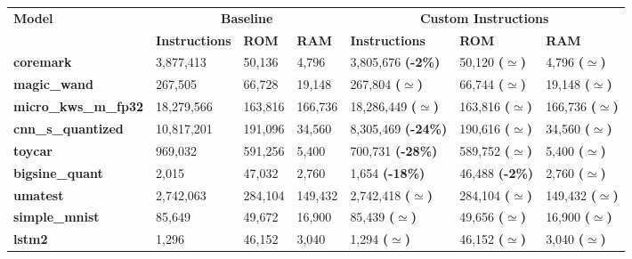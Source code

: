 \begin{table}[!ht]
    \scriptsize
    \centering
    \begin{tabular}{|l|l|l|l|l|l|l|}
        \hline
        {\textbf{Model}} & \multicolumn{3}{c|}{\textbf{Baseline}} & \multicolumn{3}{c|}{\textbf{Custom Instructions}} \\
        \cline{2-7}
        & \textbf{Instructions} & \textbf{ROM} & \textbf{RAM} & \textbf{Instructions} & \textbf{ROM} & \textbf{RAM} \\
        \hline
        {\textbf{coremark}} & 3,877,413 & 50,136 & 4,796 & 3,805,676 \textbf{(-2\%)} & 50,120 \textbf{\textbf{($\simeq$)}} & 4,796 \textbf{\textbf{($\simeq$)}} \\
        \cline{2-7}
        \hline
        {\textbf{magic\_wand}} & 267,505 & 66,728 & 19,148 & 267,804 \textbf{\textbf{($\simeq$)}} & 66,744 \textbf{\textbf{($\simeq$)}} & 19,148 \textbf{\textbf{($\simeq$)}} \\
        \cline{2-7}
        \hline
        {\textbf{micro\_kws\_m\_fp32}} & 18,279,566 & 163,816 & 166,736 & 18,286,449 \textbf{\textbf{($\simeq$)}} & 163,816 \textbf{\textbf{($\simeq$)}} & 166,736 \textbf{\textbf{($\simeq$)}} \\
        \cline{2-7}
        \hline
        {\textbf{cnn\_s\_quantized}} & 10,817,201 & 191,096 & 34,560 & 8,305,469 \textbf{(-24\%)} & 190,616 \textbf{\textbf{($\simeq$)}} & 34,560 \textbf{\textbf{($\simeq$)}} \\
        \cline{2-7}
        \hline
        {\textbf{toycar}} & 969,032 & 591,256 & 5,400 & 700,731 \textbf{(-28\%)} & 589,752 \textbf{\textbf{($\simeq$)}} & 5,400 \textbf{\textbf{($\simeq$)}} \\
        \cline{2-7}
        \hline
        {\textbf{bigsine\_quant}} & 2,015 & 47,032 & 2,760 & 1,654 \textbf{(-18\%)} & 46,488 \textbf{(-2\%)} & 2,760 \textbf{\textbf{($\simeq$)}} \\
        \cline{2-7}
        \hline
        {\textbf{umatest}} & 2,742,063 & 284,104 & 149,432 & 2,742,418 \textbf{\textbf{($\simeq$)}} & 284,104 \textbf{\textbf{($\simeq$)}} & 149,432 \textbf{\textbf{($\simeq$)}} \\
        \cline{2-7}
        \hline
        {\textbf{simple\_mnist}} & 85,649 & 49,672 & 16,900 & 85,439 \textbf{($\simeq$)} & 49,656 \textbf{($\simeq$)} & 16,900 \textbf{($\simeq$)} \\
        \cline{2-7}
        \hline
        {\textbf{lstm2}} & 1,296 & 46,152 & 3,040 & 1,294 \textbf{($\simeq$)} & 46,152 \textbf{($\simeq$)} & 3,040 \textbf{($\simeq$)} \\

\end{tabular}
\end{table}
